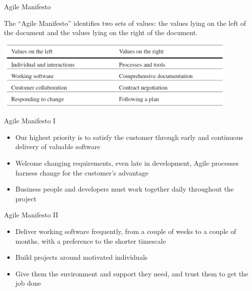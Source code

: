 \documentclass{beamer}
\begin{document}
\begin{frame}{\centerline{Agile Manifesto}}

The ``Agile Manifesto'' identifies two sets of values: the values lying on the left of the document and the values lying on the right of the document.
\begin{center}
\includegraphics[width=120mm]{A2022.IDSEPC.ProcessoDiProduzione/img-img01.png}
\end{center}
\end{frame}

\begin{frame}{\centerline{Agile Manifesto I}}
\begin{itemize}
\item  Our highest priority is to satisfy the customer through early and continuous delivery of valuable software

\item  Welcome changing requirements, even late in development, Agile processes harness change for the customer's advantage

\item  Business people and developers must work together daily throughout the project

\end{itemize}
\end{frame}

\begin{frame}{\centerline{Agile Manifesto II}}
\begin{itemize}
\item  Deliver working software frequently, from a couple of weeks to a couple of months, with a preference to the shorter timescale

\item  Build projects around motivated individuals

\item  Give them the environment and support they need, and trust them to get the job done

\end{itemize}
\end{frame}
\end{document}
